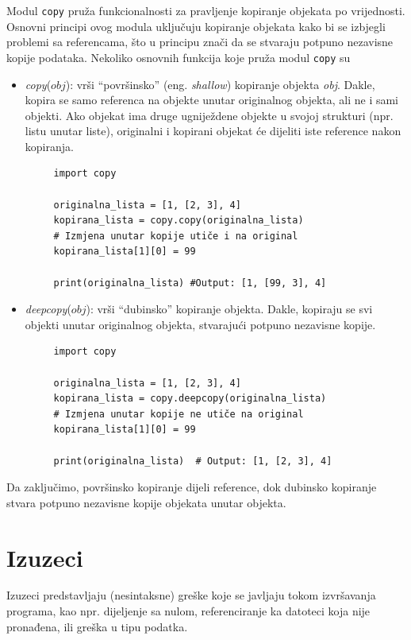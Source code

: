   Modul \texttt{copy} pruža funkcionalnosti za pravljenje kopiranje objekata po vrije\-dnosti. Osnovni principi ovog modula uključuju kopiranje objekata kako bi se izbjegli problemi sa referencama, što u principu znači da se stvaraju potpuno nezavisne kopije podataka. Nekoliko osnovnih funkcija koje pruža modul \texttt{copy} su 
  \begin{itemize}
  	\item \emph{copy}($obj$): vrši ``površinsko'' (eng. \emph{shallow})  kopiranje objekta \emph{obj}. Dakle, kopira se samo referenca na objekte unutar originalnog objekta, ali ne i sami objekti. Ako objekat ima druge ugniježdene objekte u svojoj strukturi (npr. listu unutar liste), originalni i kopirani objekat će dijeliti iste reference nakon kopiranja. 
  	\begin{verbatim}
  	 import copy
  	   
  	 originalna_lista = [1, [2, 3], 4]
  	 kopirana_lista = copy.copy(originalna_lista)
  	 # Izmjena unutar kopije utiče i na original
  	 kopirana_lista[1][0] = 99
  	  
  	 print(originalna_lista) #Output: [1, [99, 3], 4]
  	\end{verbatim}
  
  
  	\item \emph{deepcopy}($obj$): vrši ``dubinsko'' kopiranje objekta. Dakle, kopiraju se svi objekti unutar originalnog objekta, stvarajući potpuno nezavisne kopije.
  	
 \begin{verbatim}
 	 import copy
 	 
 	 originalna_lista = [1, [2, 3], 4]
 	 kopirana_lista = copy.deepcopy(originalna_lista)
 	 # Izmjena unutar kopije ne utiče na original
 	 kopirana_lista[1][0] = 99
 	 
 	 print(originalna_lista)  # Output: [1, [2, 3], 4]
 \end{verbatim}
  \end{itemize}
  
  Da zaključimo, površinsko kopiranje dijeli reference, dok dubinsko kopiranje stvara potpuno nezavisne kopije objekata unutar objekta.
  

\section{Izuzeci}

Izuzeci predstavljaju (nesintaksne) greške koje se javljaju tokom izvrša\-vanja programa, kao npr. dijeljenje sa nulom, referenciranje ka datoteci koja nije pronađena, ili greška u tipu podatka.

